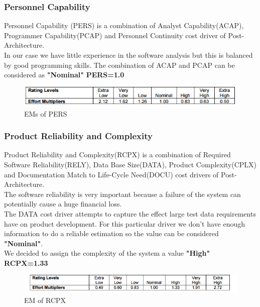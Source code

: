 \subsubsection{Personnel Capability}
Personnel Capability (PERS) is a combination of Analyst Capability(ACAP), Programmer Capability(PCAP) and Personnel Continuity cost driver of Post-Architecture.\\
In our case we have little experience in the software analysis but this is balanced by good programming skills. The combination of ACAP and PCAP can be considered as \textbf{"Nominal"}
\textbf{PERS=1.0}
\begin{figure}[H] 
	\centering
	\includegraphics[scale = 0.6]{img/PERS.png}
	\caption{EMs of PERS}
\end{figure}
		

			
\subsubsection{Product Reliability and Complexity}
	Product Reliability and Complexity(RCPX) is a combination of Required Software Reliability(RELY), Data Base Size(DATA), Product Complexity(CPLX) and Documentation Match to Life-Cycle Need(DOCU) cost drivers of Post-Architecture. 
			\\
			The software reliability is very important because a failure of the system can potentially cause a huge financial loss.\\
			The DATA cost driver attempts to capture the effect large test data requirements have on product development. For this particular driver we don’t have enough information to do a reliable estimation so the value can be considered \textbf{"Nominal"}.\\
			We decided to assign the complexity of the system a value \textbf{"High"}
\\
\textbf{RCPX=1.33}

\begin{figure}[H] 
	\centering
	\includegraphics[scale = 0.6]{img/RCPX.png}
	\caption{EM of RCPX}
\end{figure}
	
